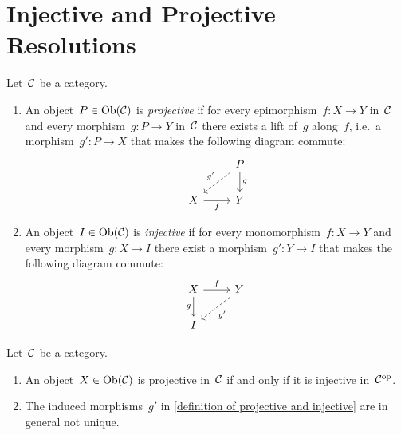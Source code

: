 \section{Injective and Projective Resolutions}


\begin{definition}
  \label{definition of projective and injective}
  Let~$\mathcal{C}$ be a category.
  \begin{enumerate}
    \item
      An object~$P \in \operatorname{Ob}(\mathcal{C})$ is \emph{projective} if for every epimorphism~$f \colon X \to Y$ in~$\mathcal{C}$ and every morphism~$g \colon P \to Y$ in~$\mathcal{C}$ there exists a lift of~$g$ along~$f$, i.e.\ a morphism~$g' \colon P \to X$ that makes the following diagram commute:
      \[
        \begin{tikzcd}
            {}
          & P
            \arrow{d}[right]{g}
            \arrow[dashed]{dl}[above left]{g'}
          \\
            X
            \arrow{r}[below]{f}
          & Y
        \end{tikzcd}
      \]
    \item
      An object~$I \in \operatorname{Ob}(\mathcal{C})$ is \emph{injective} if for every monomorphism~$f \colon X \to Y$ and every morphism~$g \colon X \to I$ there exist a morphism~$g' \colon Y \to I$ that makes the following diagram commute:
      \[
        \begin{tikzcd}
            X
            \arrow{r}[above]{f}
            \arrow{d}[left]{g}
          & Y
            \arrow[dashed]{dl}[below right]{g'}
          \\
            I
          & {}
        \end{tikzcd}
      \]
  \end{enumerate}
\end{definition}


\begin{remark}
  Let~$\mathcal{C}$ be a category.
  \begin{enumerate}
    \item
      An object~$X \in \operatorname{Ob}(\mathcal{C})$ is projective in~$\mathcal{C}$ if and only if it is injective in~$\mathcal{C}^{\mathrm{op}}$.
    \item
      The induced morphisms~$g'$ in \cref{definition of projective and injective} are in general not unique.
  \end{enumerate}
\end{remark}



